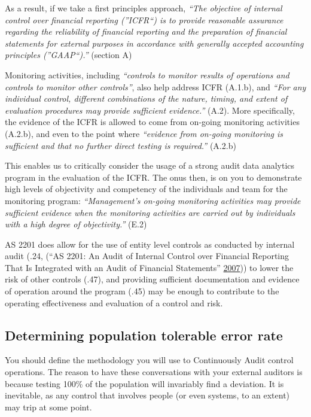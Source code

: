\documentclass[
]{book}
\begin{document}
As a result, if we take a first principles approach, \emph{``The objective of internal control over financial reporting (''ICFR``) is to provide reasonable assurance regarding the reliability of financial reporting and the preparation of financial statements for external purposes in accordance with generally accepted accounting principles (''GAAP``).''} (section A)

Monitoring activities, including \emph{``controls to monitor results of operations and controls to monitor other controls''}, also help address ICFR (A.1.b), and \emph{``For any individual control, different combinations of the nature, timing, and extent of evaluation procedures may provide sufficient evidence.''} (A.2). More specifically, the evidence of the ICFR is allowed to come from on-going monitoring activities (A.2.b), and even to the point where \emph{``evidence from on-going monitoring is sufficient and that no further direct testing is required.''} (A.2.b)

This enables us to critically consider the usage of a strong audit data analytics program in the evaluation of the ICFR. The onus then, is on you to demonstrate high levels of objectivity and competency of the individuals and team for the monitoring program: \emph{``Management's on-going monitoring activities may provide sufficient evidence when the monitoring activities are carried out by individuals with a high degree of objectivity.''} (E.2)

AS 2201 does allow for the use of entity level controls as conducted by internal audit (.24, (``AS 2201: An Audit of Internal Control over Financial Reporting That Is Integrated with an Audit of Financial Statements'' \protect\hyperlink{ref-pcaob-as2201}{2007})) to lower the risk of other controls (.47), and providing sufficient documentation and evidence of operation around the program (.45) may be enough to contribute to the operating effectiveness and evaluation of a control and risk.

\hypertarget{determining-population-tolerable-error-rate}{%
\subsection{Determining population tolerable error rate}\label{determining-population-tolerable-error-rate}}

You should define the methodology you will use to Continuously Audit control operations. The reason to have these conversations with your external auditors is because testing 100\% of the population will invariably find a deviation. It is inevitable, as any control that involves people (or even systems, to an extent) may trip at some point.
\end{document}
